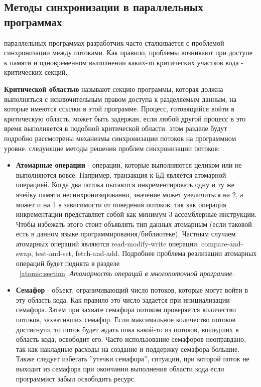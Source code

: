 { %
	\subsection{Методы синхронизации в параллельных программах}
	 параллельных программах разработчик часто сталкивается с проблемой синхронизации между потоками. Как правило, проблемы возникают при доступе к памяти и одновременном выполнении каких-то критических участков кода - критических секций.
	\par\textbf{Критической областью} называют секцию программы, которая должна выполняться с исключительным правом доступа к разделяемым данным, на которые имеются ссылки в этой программе. Процесс, готовящийся войти в критическую область, может быть задержан, если любой другой процесс в это время выполняется в подобной критической области.
	 этом разделе будут подробно рассмотрены механизмы синхронизации потоков на программном уровне.
	 следующие методы решения проблем синхронизации потоков:
		\begin{itemize}
			\item\textbf{Атомарные операции} - операции, которые выполняются целиком или не выполняются вовсе. Например, транзакция к БД является атомарной операцией. Когда два потока пытаются инкрементировать одну и ту же ячейку памяти несинхронизированно, значение может увеличиться на 2, а может и на 1 в зависимости от поведения потоков, так как операция инкрементации представляет собой как минимум 3 ассемблерные инструкции. Чтобы избежать этого стоит объявлять тип данных атомарным (если таковой есть в данном языке программирования/библиотеке). Частным случаем атомарных операций являются read-modify-write операции: compare-and-swap, test-and-set, fetch-and-add. Подробнее проблема реализации атомарных операций будет поднята в разделе\\~\ref{atomic:section} \textit{Атомарность операций в многопоточной программе}.
			\item\textbf{Семафор} - объект, ограничивающий число потоков, которые могут войти в эту область кода. Как правило это число задается при инициализации семафора. Затем при захвате семафора потоком проверяется количество потоков, захвативших семафор. Если максимальное количество потоков достигнуто, то поток будет ждать пока какой-то из потоков, вошедших в область кода, освободит его. Часто использование семафоров неоправдано, так как накладные расходы на создание и поддержку семафора большие. Также следует избегать ''утечки семафора'', ситуации, при которой поток не выходит из семафора при окончании выполнения области кода если программист забыл освободить ресурс.

\end{itemize}}
